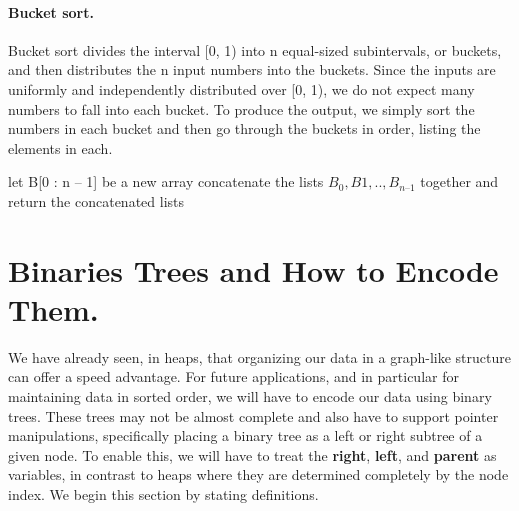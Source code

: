 \paragraph{Bucket sort.}
Bucket sort divides the interval [0, 1) into n equal-sized subintervals, or buckets, and then distributes the n input numbers into the buckets. Since the inputs are uniformly and independently distributed over [0, 1), we do not expect many numbers to fall into each bucket. To produce the output, we simply sort the numbers in each bucket and then go through the buckets in order, listing the elements in each.

  \begin{algorithm}
    	let B[0 : n – 1] be a new array
	\For{ $i \leftarrow [1, n]$}{
	    insert $A_{i}$ into list $B_{ \lfloor n A_{i} \rfloor} ]$
       	}
	concatenate the lists $B_{0}, B{1}, .. , B_{n – 1}$ together and\\
	return the concatenated lists
  \end{algorithm}



\section{Binaries Trees and How to Encode Them.} We have already seen, in heaps, that organizing our data in a graph-like structure can offer a speed advantage. For future applications, and in particular for maintaining data in sorted order, we will have to encode our data using binary trees. These trees may not be almost complete and also have to support pointer manipulations, specifically placing a binary tree as a left or right subtree of a given node. To enable this, we will have to treat the \textbf{right}, \textbf{left}, and \textbf{parent} as variables, in contrast to heaps where they are determined completely by the node index. We begin this section by stating definitions.


